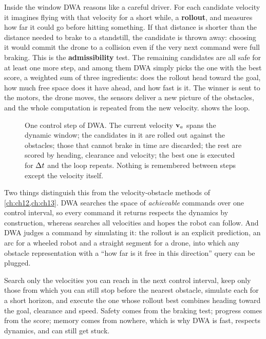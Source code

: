 Inside the window DWA reasons like a careful driver. For each candidate
velocity it imagines flying with that velocity for a short while, a
\textbf{rollout}, and measures how far it could go before
hitting something. If that distance is shorter than the distance needed to
brake to a standstill, the candidate is thrown away: choosing it would commit
the drone to a collision even if the very next command were full braking.
This is the \textbf{admissibility} test. The
remaining candidates are all safe for at least one more step, and among them
DWA simply picks the one with the best score, a weighted sum of three
ingredients: does the rollout head toward the goal, how much free space does
it have ahead, and how fast is it. The winner is sent to the motors, the
drone moves, the sensors deliver a new picture of the obstacles, and the whole
computation is repeated from the new velocity. 
shows the loop.

\begin{figure}[tb]
  \centering
  \caption{One control step of DWA. The current velocity $\mathbf{v}_a$ spans the
  dynamic window; the candidates in it are rolled out against the obstacles;
  those that cannot brake in time are discarded; the rest are scored by
  heading, clearance and velocity; the best one is executed for $\Delta t$ and the
  loop repeats. Nothing is remembered between steps except the velocity
  itself.}
  \label{fig:ch14-pipeline}
\end{figure}

Two things distinguish this from the velocity-obstacle methods of
\cref{ch:ch12,ch:ch13}. DWA searches the space of \emph{achievable} commands
over one control interval, so every command it returns respects the dynamics
by construction, whereas \orca searches all velocities and hopes the robot can
follow. And DWA judges a command by simulating it: the rollout is an explicit
prediction, an arc for a wheeled robot and a straight segment for a drone,
into which any obstacle representation with a ``how far is it free in this
direction'' query can be plugged.

\begin{keyidea}
Search only the velocities you can reach in the next control interval, keep
only those from which you can still stop before the nearest obstacle, simulate
each for a short horizon, and execute the one whose rollout best combines
heading toward the goal, clearance and speed. Safety comes from the braking
test; progress comes from the score; memory comes from nowhere, which is why
DWA is fast, respects dynamics, and can still get stuck.
\end{keyidea}


